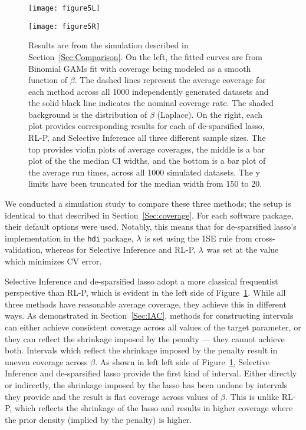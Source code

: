 \begin{figure}[htb!]
  \begin{center}
    \begin{minipage}[t]{0.34\linewidth}
      \centering
      \texttt{[image: figure5L]}
    \end{minipage}
    \hfill
    \begin{minipage}[t]{0.64\linewidth}
      \centering
      \texttt{[image: figure5R]}
    \end{minipage}
    \caption{\label{Fig:laplace_comparison} Results are from the simulation described in Section~\ref{Sec:Comparison}. On the left, the fitted curves are from Binomial GAMs fit with coverage being modeled as a smooth function of $\beta$. The dashed lines represent the average coverage for each method across all 1000 independently generated datasets and the solid black line indicates the nominal coverage rate. The shaded background is the distribution of $\beta$ (Laplace). On the right, each plot provides corresponding results for each of de-sparsified lasso, RL-P, and Selective Inference all three different sample sizes. The top provides violin plots of average coverages, the middle is a bar plot of the the median CI widths, and the bottom is a bar plot of the average run times, across all 1000 simulated datasets. The y limits have been truncated for the median width from 150 to 20.}
  \end{center}
\end{figure}

We conducted a simulation study to compare these three methods; the setup is identical to that described in Section~\ref{Sec:coverage}. For each software package, their default options were used. Notably, this means that for de-sparsified lasso's implementation in the \texttt{hdi} package, $\lambda$ is set using the 1SE rule from cross-validation, whereas for Selective Inference and RL-P, $\lambda$ was set at the value which minimizes CV error.

Selective Inference and de-sparsified lasso adopt a more classical frequentist perspective than RL-P, which is evident in the left side of Figure~\ref{Fig:laplace_comparison}. While all three methods have reasonable average coverage, they achieve this in different ways. As demonstrated in Section~\ref{Sec:IAC}, methods for constructing intervals can either achieve consistent coverage across all values of the target parameter, or they can reflect the shrinkage imposed by the penalty --- they cannot achieve both. Intervals which reflect the shrinkage imposed by the penalty result in uneven coverage across $\beta$. As shown in left left side of Figure~\ref{Fig:laplace_comparison}, Selective Inference and de-sparsified lasso provide the first kind of interval. Either directly or indirectly, the shrinkage imposed by the lasso has been undone by intervals they provide and the result is flat coverage across values of $\beta$. This is unlike RL-P, which reflects the shrinkage of the lasso and results in higher coverage where the prior density (implied by the penalty) is higher.

